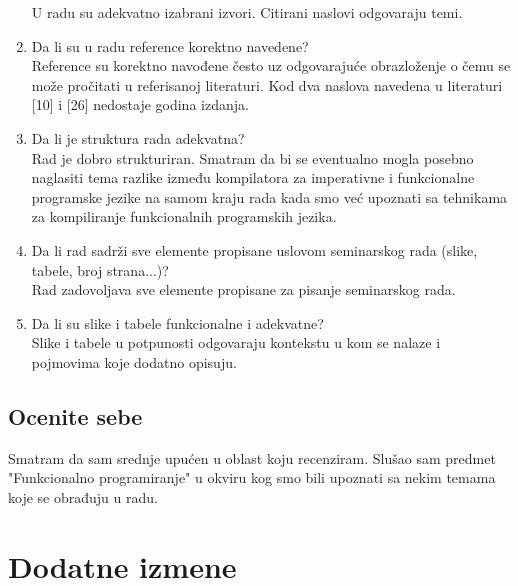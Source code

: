 \documentclass[a4paper]{report}
\begin{document}
\begin{enumerate}
U radu su adekvatno izabrani izvori. Citirani naslovi odgovaraju temi.
\item Da li su u radu reference korektno navedene?\\
Reference su korektno navođene često uz odgovarajuće obrazloženje o čemu se može pročitati u referisanoj literaturi. Kod dva naslova navedena u literaturi [10] i [26] nedostaje godina izdanja.
\item Da li je struktura rada adekvatna?\\
Rad je dobro strukturiran. Smatram da bi se eventualno mogla posebno naglasiti tema razlike između kompilatora za imperativne i funkcionalne programske jezike na samom kraju rada kada smo već upoznati sa tehnikama za kompiliranje funkcionalnih programskih jezika.
\item Da li rad sadrži sve elemente propisane uslovom seminarskog rada (slike, tabele, broj strana...)?\\
Rad zadovoljava sve elemente propisane za pisanje seminarskog rada.
\item Da li su slike i tabele funkcionalne i adekvatne?\\
Slike i tabele u potpunosti odgovaraju kontekstu u kom se nalaze i pojmovima koje dodatno opisuju.
\end{enumerate}

\section{Ocenite sebe}

Smatram da sam srednje upućen u oblast koju recenziram. Slušao sam predmet "Funkcionalno programiranje" u okviru kog smo bili upoznati sa nekim temama koje se obrađuju u radu.

\chapter{Dodatne izmene}
\end{document}
